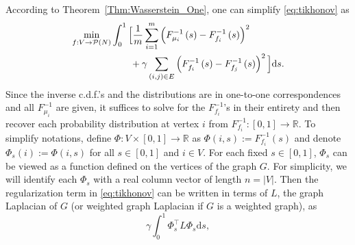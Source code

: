 \documentclass[letterpaper]{article} %
\begin{document}
According to Theorem~\ref{Thm:Wasserstein_One}, one can simplify \eqref{eq:tikhonov} as 
\begin{equation*}
  \begin{aligned}
    \min_{f:V\to \P(N)}&\int_0^1 \Big[ \frac{1}{m} \sum_{i=1}^m \left(F_{\mu_i}^{-1}\left( s \right)-F_{f_i}^{-1}\left( s \right)\right)^2\\
    &\qquad +\gamma \sum_{\left( i,j \right)\in E}\left( F_{f_i}^{-1}\left( s \right)-F_{f_j}^{-1}\left( s \right) \right)^2  \Big]\mathrm{d}s.
  \end{aligned}
  \end{equation*}
Since the inverse c.d.f.'s and the distributions are in one-to-one correspondences and all $F_{\mu_i}^{-1}$ are given, it suffices to solve for the $F_{f_i}^{-1}$'s in their entirety and then recover each probability distribution at vertex $i$ from $F_{f_i}^{-1}:[0,1]\rightarrow\mathbb{R}$. To simplify notations, define $\Phi:V\times \left[ 0,1 \right]\rightarrow \mathbb{R}$ as $\Phi\left( i,s \right):=F_{f_i}^{-1}\left( s \right)$
and denote $\Phi_s \left( i \right):=\Phi \left( i,s \right)$ for all $s\in \left[ 0,1 \right]$ and $i\in V$.
For each fixed $s\in\left[0,1\right]$, $\Phi_s$ can be viewed as a function defined on the vertices of the graph $G$. For simplicity, we will identify each $\Phi_s$ with a real column vector of length $n=\left| V \right|$. 
Then the regularization term in \eqref{eq:tikhonov} can be written in terms of $L$, the graph Laplacian of $G$ (or weighted graph Laplacian if $G$ is a weighted graph), as
\begin{equation*}
  \gamma\int_0^1\Phi_s^{\top}L\Phi_s\mathrm{d}s,
\end{equation*}
\end{document}
